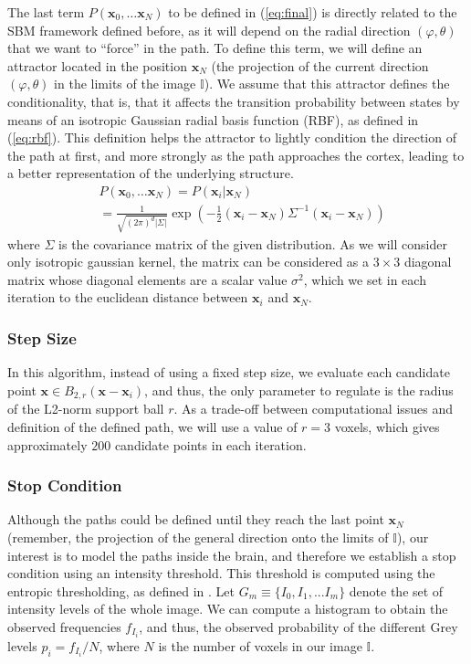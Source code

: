 The last term $P(\mathbf{x}_0, \dots \mathbf{x}_N)$ to be defined in (\ref{eq:final}) is directly related to the \ac{SBM} framework defined before, as it will depend on the radial direction $(\varphi, \theta)$ that we want to ``force'' in the path. To define this term, we will define an attractor located in the position $\mathbf{x}_N$ (the projection of the current direction $(\varphi,\theta)$ in the limits of the image $\mathbb{I}$). We assume that this attractor defines the conditionality, that is, that it affects the transition probability between states by means of an isotropic Gaussian radial basis function (RBF), as defined in (\ref{eq:rbf}). This definition helps the attractor to lightly condition the direction of the path at first, and more strongly as the path approaches the cortex, leading to a better representation of the underlying structure. 
\begin{align}\label{eq:rbf}
&P(\mathbf{x}_0, \dots \mathbf{x}_N) = P(\mathbf{x}_i|\mathbf{x}_N)  \\&= \frac{1}{\sqrt{(2\pi)^d|\Sigma|}} \exp\left(-\frac{1}{2}(\mathbf{x}_i-\mathbf{x}_N)\Sigma^{-1}(\mathbf{x}_i-\mathbf{x}_N)\right) 
\end{align}
where $\Sigma$ is the covariance matrix of the given distribution. As we will consider only isotropic gaussian kernel, the matrix can be considered as a $3\times3$ diagonal matrix whose diagonal elements are a scalar value $\sigma^2$, which we set in each iteration to the euclidean distance between $\mathbf{x}_i$ and $\mathbf{x}_N$. 

\subsubsection{Step Size}
In this algorithm, instead of using a fixed step size, we evaluate each candidate point $\mathbf{x} \in B_{2,r}(\mathbf{x}-\mathbf{x}_i)$, and thus, the only parameter to regulate is the radius of the L2-norm support ball $r$. As a trade-off between computational issues and definition of the defined path, we will use a value of $r=3$ voxels, which gives approximately $200$ candidate points in each iteration. 

\subsubsection{Stop Condition}
Although the paths could be defined until they reach the last point $\mathbf{x}_N$ (remember, the projection of the general direction onto the limits of $\mathbb{I}$), our interest is to model the paths inside the brain, and therefore we establish a stop condition using an intensity threshold. This threshold is computed using the entropic thresholding, as defined in \cite{Yen1995}. Let $G_m \equiv \{I_0, I_1, ... I_m\} $ denote the set of intensity levels of the whole image. We can compute a histogram to obtain the observed frequencies $f_{I_i}$, and thus, the observed probability of the different Grey levels $p_{i} = f_{I_i}/N$, where $N$ is the number of voxels in our image $\mathbb{I}$.

